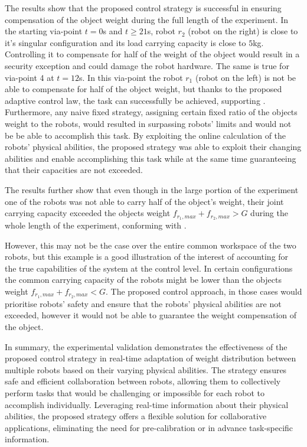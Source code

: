 The results show that the proposed control strategy is successful in ensuring compensation of the object weight during the full length of the experiment. In the starting via-point $t=0$s and $t\geq21$s, robot $r_2$ (robot on the right) is close to it's singular configuration and its load carrying capacity is close to $5$kg. Controlling it to compensate for half of the weight of the object would result in a security exception and could damage the robot hardware. The same is true for via-point 4 at $t=12$s. In this via-point the robot $r_1$ (robot on the left) is not be able to compensate for half of the object weight, but thanks to the proposed adaptive control law, the task can successfully be achieved, supporting . 
Furthermore, any naive fixed strategy, assigning certain fixed ratio of the objects weight to the robots, would resulted in surpassing robots' limits and would not be be able to accomplish this task. 
By exploiting the online calculation of the robots' physical abilities, the proposed strategy was able to exploit their changing abilities and enable accomplishing this task while at the same time guaranteeing that their capacities are not exceeded. 

The results further show that even though in the large portion of the experiment one of the robots was not able to carry half of the object's weight, their joint carrying capacity exceeded the objects weight $f_{r_1,max}+f_{r_2,max} >G$ during the whole length of the experiment, conforming with .

However, this may not be the case over the entire common workspace of the two robots, but this example is a good illustration of the interest of accounting for the true capabilities of the system at the control level.  In certain configurations the common carrying capacity of the robots might be lower than the objects weight $f_{r_1,max}+f_{r_2,max} <G$. The proposed control approach, in those cases would prioritise robots' safety and ensure that the robots' physical abilities are not exceeded, however it would not be able to guarantee the weight compensation of the object. 

In summary, the experimental validation demonstrates the effectiveness of the proposed control strategy in real-time adaptation of weight distribution between multiple robots based on their varying physical abilities. The strategy ensures safe and efficient collaboration between robots, allowing them to collectively perform tasks that would be challenging or impossible for each robot to accomplish individually. Leveraging real-time information about their physical abilities, the proposed strategy offers a flexible solution for collaborative applications, eliminating the need for pre-calibration or in advance task-specific information.

